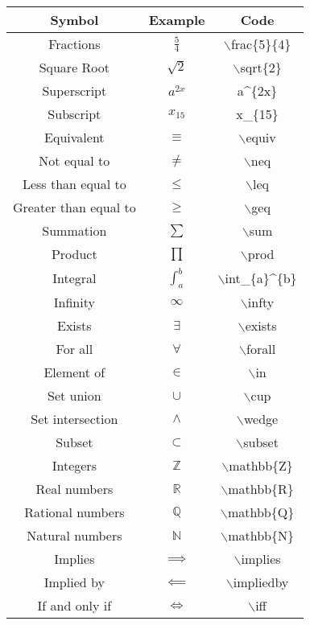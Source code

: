 \documentclass[11pt,onecolumn]{article}
\theoremstyle{definition}
\begin{document}
\renewcommand{\arraystretch}{1.5}
\begin{center}
    \begin{tabular}{|c|c|c|}
    \hline
    \textbf{Symbol} & \textbf{Example} & \textbf{Code} \\
    \hline
    Fractions & $\frac{5}{4}$ & $\backslash$frac\{5\}\{4\} \\
    Square Root & $\sqrt{2}$ & $\backslash$sqrt\{2\} \\
    Superscript & $a^{2x}$ & a\^{}\{2x\} \\
    Subscript & $x_{15}$ & x\_{}\{15\} \\
    Equivalent & $\equiv$ & $\backslash$equiv \\
    Not equal to & $\neq$ & $\backslash$neq \\
    Less than equal to & $\leq$ & $\backslash$leq \\
    Greater than equal to & $\geq$ & $\backslash$geq \\
    Summation & $\sum$ & $\backslash$sum \\
    Product & $\prod$ & $\backslash$prod \\
    Integral & $\int_{a}^{b}$ & $\backslash$int\_{}\{a\}\^{}\{b\} \\
    Infinity & $\infty$ & $\backslash$infty \\
    Exists & $\exists$ & $\backslash$exists \\
    For all & $\forall$ & $\backslash$forall \\
    Element of & $\in$ & $\backslash$in \\
    Set union & $\cup$ & $\backslash$cup \\
    Set intersection & $\wedge$ & $\backslash$wedge \\
    Subset & $\subset$ & $\backslash$subset \\
    Integers & $\mathbb{Z}$ & $\backslash$mathbb\{Z\} \\
    Real numbers & $\mathbb{R}$ & $\backslash$mathbb\{R\} \\
    Rational numbers & $\mathbb{Q}$ & $\backslash$mathbb\{Q\} \\
    Natural numbers & $\mathbb{N}$ & $\backslash$mathbb\{N\} \\
    Implies & $\implies$ & $\backslash$implies \\
    Implied by & $\impliedby$ & $\backslash$impliedby \\
    If and only if & $\iff$ & $\backslash$iff \\
    \hline
    \end{tabular}
\end{center}
\end{document}
